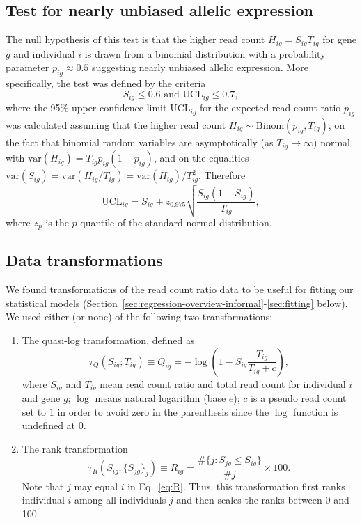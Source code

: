 \documentclass[letterpaper]{article}
\begin{document}
\subsection{Test for nearly unbiased allelic expression}

The null hypothesis of this test is that the higher read count
\(H_{ig}=S_{ig}T_{ig}\) for gene \(g\) and individual \(i\) is drawn from a
binomial distribution with a probability parameter \(p_{ig}\approx 0.5\)
suggesting nearly unbiased allelic expression.  More specifically, the test
was defined by the criteria
\begin{equation}
S_{ig} \le 0.6 \text{ and } \mathrm{UCL}_{ig} \le 0.7,
\label{eq:unbiased-test}
\end{equation}
where the 95\% upper confidence limit \(\mathrm{UCL}_{ig}\) for the expected
read count ratio \(p_{ig}\) was calculated assuming that the higher read count
\(H_{ig}\sim \mathrm{Binom}(p_{ig}, T_{ig})\), on the fact that binomial
random variables are asymptotically (as \(T_{ig}\rightarrow \infty\)) normal
with \(\mathrm{var}(H_{ig}) = T_{ig}p_{ig}(1-p_{ig})\), and on the equalities
\(\mathrm{var}(S_{ig}) = \mathrm{var}(H_{ig}/T_{ig}) =
\mathrm{var}(H_{ig})/T_{ig}^2\).  Therefore
\begin{equation}
\mathrm{UCL}_{ig} = S_{ig} + z_{0.975} \sqrt{\frac{S_{ig} (1 - S_{ig})}{T_{ig}}},
\end{equation}
where $z_{p}$ is the $p$ quantile of the standard normal distribution.

\subsection{Data transformations}

We found transformations of the read count ratio data to be useful for fitting
our statistical models
(Section~\ref{sec:regression-overview-informal}-\ref{sec:fitting} below).
We used either (or none) of the following two transformations:

\begin{enumerate}
\item
The quasi-log transformation, defined as
\begin{equation}
\tau_Q(S_{ig};T_{ig}) \equiv Q_{ig} = - \log \left( 1 - S_{ig} \frac{T_{ig}}{T_{ig} + c}
\right),
\label{eq:Q}
\end{equation}
where \(S_{ig}\) and \(T_{ig}\) mean read count ratio and total read count for
individual \(i\) and gene \(g\);
\(\log\) means natural logarithm (base \(e\));  \(c\) is a pseudo read
count set to \(1\) in order to avoid zero in the parenthesis since the \(\log\)
function is undefined at \(0\).
\item 
The rank transformation
\begin{equation}
\tau_R(S_{ig};\{S_{jg}\}_j) \equiv R_{ig} = \frac{\# \{j: S_{jg}\le S_{ig}
\}}{\# j} \times 100.
\label{eq:R}
\end{equation}
Note that \(j\) may equal \(i\) in Eq.~\ref{eq:R}.
Thus, this transformation first ranks individual \(i\) among all individuals
\(j\) and then scales the ranks between 0 and 100.
\end{enumerate}
\end{document}
